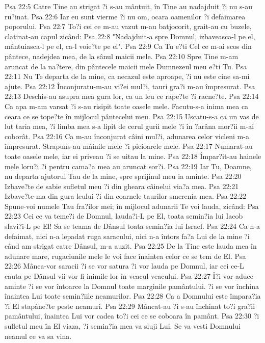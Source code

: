 Psa 22:5  Catre Tine au strigat ?i s-au mântuit, în Tine au nadajduit ?i nu s-au ru?inat.
Psa 22:6  Iar eu sunt vierme ?i nu om, ocara oamenilor ?i defaimarea poporului.
Psa 22:7  To?i cei ce m-au vazut m-au batjocorit, grait-au cu buzele, clatinat-au capul zicând:
Psa 22:8  "Nadajduit-a spre Domnul, izbaveasca-l pe el, mântuiasca-l pe el, ca-l voie?te pe el".
Psa 22:9  Ca Tu e?ti Cel ce m-ai scos din pântece, nadejdea mea, de la sânul maicii mele.
Psa 22:10  Spre Tine m-am aruncat de la na?tere, din pântecele maicii mele Dumnezeul meu e?ti Tu.
Psa 22:11  Nu Te departa de la mine, ca necazul este aproape, ?i nu este cine sa-mi ajute.
Psa 22:12  Înconjuratu-m-au vi?ei mul?i, tauri gra?i m-au împresurat.
Psa 22:13  Deschis-au asupra mea gura lor, ca un leu ce rape?te ?i racne?te.
Psa 22:14  Ca apa m-am varsat ?i s-au risipit toate oasele mele. Facutu-s-a inima mea ca ceara ce se tope?te în mijlocul pântecelui meu.
Psa 22:15  Uscatu-s-a ca un vas de lut taria mea, ?i limba mea s-a lipit de cerul gurii mele ?i în ?arâna mor?ii m-ai coborât.
Psa 22:16  Ca m-au înconjurat câini mul?i, adunarea celor vicleni m-a împresurat. Strapuns-au mâinile mele ?i picioarele mele.
Psa 22:17  Numarat-au toate oasele mele, iar ei priveau ?i se uitau la mine.
Psa 22:18  Împar?it-au hainele mele loru?i ?i pentru cama?a mea au aruncat sor?i.
Psa 22:19  Iar Tu, Doamne, nu departa ajutorul Tau de la mine, spre sprijinul meu ia aminte.
Psa 22:20  Izbave?te de sabie sufletul meu ?i din gheara câinelui via?a mea.
Psa 22:21  Izbave?te-ma din gura leului ?i din coarnele taurilor smerenia mea.
Psa 22:22  Spune-voi numele Tau fra?ilor mei; în mijlocul adunarii Te voi lauda, zicând:
Psa 22:23  Cei ce va teme?i de Domnul, lauda?i-L pe El, toata semin?ia lui Iacob slavi?i-L pe El! Sa se teama de Dânsul toata semin?ia lui Israel.
Psa 22:24  Ca n-a defaimat, nici n-a lepadat ruga saracului, nici n-a întors fa?a Lui de la mine ?i când am strigat catre Dânsul, m-a auzit.
Psa 22:25  De la Tine este lauda mea în adunare mare, rugaciunile mele le voi face înaintea celor ce se tem de El.
Psa 22:26  Mânca-vor saracii ?i se vor satura ?i vor lauda pe Domnul, iar cei ce-L cauta pe Dânsul vii vor fi inimile lor în veacul veacului.
Psa 22:27  Î?i vor aduce aminte ?i se vor întoarce la Domnul toate marginile pamântului. ?i se vor închina înaintea Lui toate semin?iile neamurilor.
Psa 22:28  Ca a Domnului este împara?ia ?i El stapâne?te peste neamuri.
Psa 22:29  Mâncat-au ?i s-au închinat to?i gra?ii pamântului, înaintea Lui vor cadea to?i cei ce se coboara în pamânt.
Psa 22:30  ?i sufletul meu în El viaza, ?i semin?ia mea va sluji Lui. Se va vesti Domnului neamul ce va sa vina.
